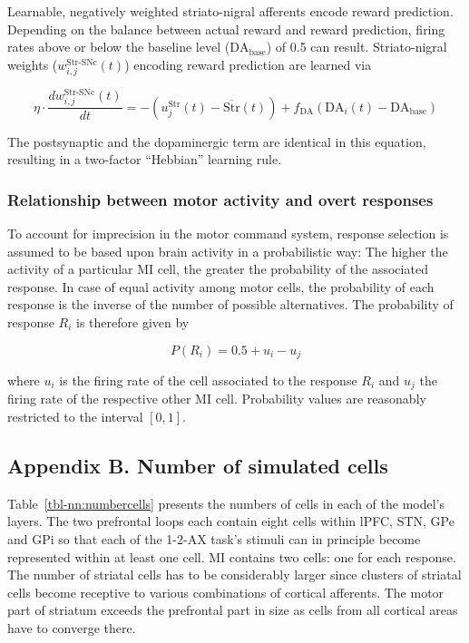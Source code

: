 \documentclass[
  11pt,
  a4paper,
]{scrbook}
\begin{document}
Learnable, negatively weighted striato-nigral afferents encode reward
prediction. Depending on the balance between actual reward and reward
prediction, firing rates above or below the baseline level
(\(\text{DA}_\text{base}\)) of 0.5 can result. Striato-nigral weights
(\(w_{i,j}^\text{Str-SNc}(t)\)) encoding reward prediction are learned
via

\[
  \eta  \cdot \frac{d w_{i,j}^\text{Str-SNc}(t)}{dt} = - (u_j^\text{Str}(t) - \overline{\text{Str}}(t) ) + f_\text{DA}(\text{DA}_i(t) - \text{DA}_\text{base})
\]

The postsynaptic and the dopaminergic term are identical in this
equation, resulting in a two-factor ``Hebbian'' learning rule.

\subsubsection*{Relationship between motor activity and overt
responses}\label{relationship-between-motor-activity-and-overt-responses}

To account for imprecision in the motor command system, response
selection is assumed to be based upon brain activity in a probabilistic
way: The higher the activity of a particular MI cell, the greater the
probability of the associated response. In case of equal activity among
motor cells, the probability of each response is the inverse of the
number of possible alternatives. The probability of response \(R_i\) is
therefore given by

\[
    P(R_i) = 0.5 + u_i - u_j
\]

where \(u_i\) is the firing rate of the cell associated to the response
\(R_i\) and \(u_j\) the firing rate of the respective other MI cell.
Probability values are reasonably restricted to the interval \([0, 1]\).

\subsection*{Appendix B. Number of simulated
cells}\label{appendix-b.-number-of-simulated-cells}

Table~\ref{tbl-nn:numbercells} presents the numbers of cells in each of
the model's layers. The two prefrontal loops each contain eight cells
within lPFC, STN, GPe and GPi so that each of the 1-2-AX task's stimuli
can in principle become represented within at least one cell. MI
contains two cells: one for each response. The number of striatal cells
has to be considerably larger since clusters of striatal cells become
receptive to various combinations of cortical afferents. The motor part
of striatum exceeds the prefrontal part in size as cells from all
cortical areas have to converge there.
\end{document}
